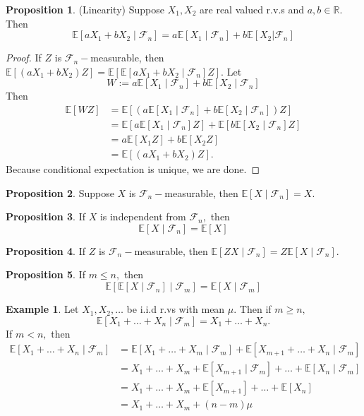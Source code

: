 \documentclass[10pt, oneside]{article}
\newcommand{\bbR}{\mathbb{R}}
\newcommand{\bbE}{\mathbb{E}}
\theoremstyle{definition}
\newtheorem{exmp}{Example}[section]
\newtheorem{prop}{Proposition}
\begin{document}
\begin{prop}(Linearity) Suppose $X_1, X_2$ are real valued r.v.s and $a,b \in \bbR.$ Then 
\[\bbE[aX_1 + bX_2 \mid \mathcal{F}_n] =  a\bbE[X _1 \mid \mathcal{F}_n] +  b\bbE[ X_2 | \mathcal{F}_n]\]
\end{prop}
\begin{proof}
    If $Z$ is $\mathcal{F}_n-$measurable, then  $\bbE[(aX_1 + bX_2 ) Z] = \bbE[\bbE[aX_1 + bX_2 \mid \mathcal{F}_n] Z].$ Let
    \[W:= a\bbE[X_1 \mid \mathcal{F}_n] + b\bbE[X_2 \mid \mathcal{F}_n]\] Then 
    \begin{align*}
        \bbE[W Z] &= \bbE[(a \bbE[X_1 \mid \mathcal{F}_n] + b\bbE[X_2 \mid \mathcal{F}_n])  Z]\\
        &= \bbE[a \bbE[X_1 \mid \mathcal{F}_n] Z] + \bbE[b\bbE[X_2 \mid \mathcal{F}_n] Z]\\
        &= a\bbE[X_1  Z] + b\bbE[X_2  Z]\\
        &= \bbE[(aX_1 + bX_2)  Z].
    \end{align*}
    Because conditional expectation is unique, we are done.
\end{proof}
\begin{prop}
    Suppose $X$ is $\mathcal{F}_n-$measurable, then $\bbE[X \mid \mathcal{F}_n] = X.$
\end{prop}
\begin{prop}
    If $X$ is independent from $\mathcal{F}_n,$ then 
    \[\bbE[X \mid \mathcal{F}_n] = \bbE[X]\]
\end{prop}
\begin{prop}
    If $Z$ is $\mathcal{F}_n-$measurable, then 
    $\bbE[ZX \mid \mathcal{F}_n] = Z\bbE[X \mid \mathcal{F}_n].$
\end{prop}
\begin{prop}
    If $m\leq n,$ then 
    \[\bbE[\bbE[X \mid \mathcal{F}_n] \mid \mathcal{F}_m]= \bbE[X \mid \mathcal{F}_m]\]
\end{prop}
\begin{exmp}
    Let $X_1, X_2,\dots$ be i.i.d r.vs with mean $\mu.$ Then if $m\geq n,$ 
    \[\bbE[X_1  + \dots  + X_n \mid \mathcal{F}_m] = X_1 + \dots + 
 X_n.\] If $m < n,$ then 
 \begin{align*}
  \bbE[X_1 + \dots + X_n \mid \mathcal{F}_m] &= \bbE[X_1 + \dots 
 + X_m \mid \mathcal{F}_m] + \bbE[X_{m+1} + \dots + X_n \mid \mathcal{F}_m]   \\
 &= X_1 + \dots + X_m + \bbE[X_{m+1} \mid \mathcal{F}_m] + \dots  + \bbE[X_n \mid \mathcal{F}_m]\\
 &= X_1 + \dots + X_m + \bbE[X_{m+1}] + \dots  + \bbE[X_n ]\\
 &= X_1 + \dots + X_m + (n-m)\mu
 \end{align*}
 
\end{exmp}
\end{document}
